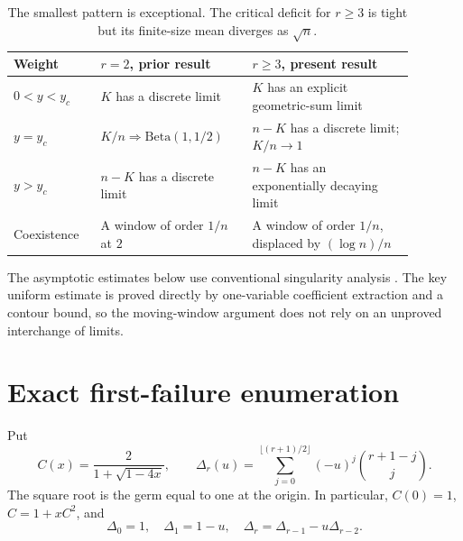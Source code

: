 \documentclass[11pt]{article}
\numberwithin{equation}{section}
\theoremstyle{definition}
\begin{document}
\begin{table}[ht]
\centering\small
\begin{tabular}{@{}p{0.19\linewidth}p{0.33\linewidth}p{0.36\linewidth}@{}}
\toprule
Weight & \(r=2\), prior result & \(r\ge3\), present result \\
\midrule
\(0<y<y_c\) & \(K\) has a discrete limit & \(K\) has an explicit geometric-sum limit \\
\(y=y_c\) & \(K/n\Rightarrow\mathrm{Beta}(1,1/2)\) & \(n-K\) has a discrete limit; \(K/n\to1\) \\
\(y>y_c\) & \(n-K\) has a discrete limit & \(n-K\) has an exponentially decaying limit \\
Coexistence & A window of order \(1/n\) at \(2\) & A window of order \(1/n\), displaced by \((\log n)/n\) \\
\bottomrule
\end{tabular}
\caption{The smallest pattern is exceptional. The critical deficit for
\(r\ge3\) is tight but its finite-size mean diverges as \(\sqrt n\).}
\label{fpf:lp:tab:phases}
\end{table}

The asymptotic estimates below use conventional singularity analysis
\cite{fpf-lp-fo}. The key uniform estimate is proved directly by one-variable
coefficient extraction and a contour bound, so the moving-window argument
does not rely on an unproved interchange of limits.

\section{Exact first-failure enumeration}
\label{fpf:lp:sec:enumeration}

Put
\begin{equation}\label{fpf:lp:eq:C-D}
 C(x)=\frac{2}{1+\sqrt{1-4x}},\qquad
 \Delta_r(u)=\sum_{j=0}^{\lfloor(r+1)/2\rfloor}
             (-u)^j\binom{r+1-j}{j}.
\end{equation}
The square root is the germ equal to one at the origin. In particular,
\(C(0)=1\), \(C=1+xC^2\), and
\[
 \Delta_0=1,\quad \Delta_1=1-u,\quad \Delta_r=\Delta_{r-1}-u\Delta_{r-2}.
\]
\end{document}
